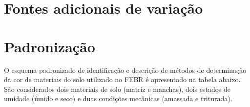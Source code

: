 \documentclass[
]{book}
\begin{document}
\hypertarget{fontes-adicionais-de-variauxe7uxe3o}{%
\section{Fontes adicionais de variação}\label{fontes-adicionais-de-variauxe7uxe3o}}

\hypertarget{padronizauxe7uxe3o}{%
\section{Padronização}\label{padronizauxe7uxe3o}}

O esquema padronizado de identificação e descrição de métodos de determinação da cor de materiais do solo utilizado no FEBR é apresentado na tabela abaixo. São considerados dois materiais de solo (matriz e manchas), dois estados de umidade (úmido e seco) e duas condições mecânicas (amassada e triturada).
\end{document}
